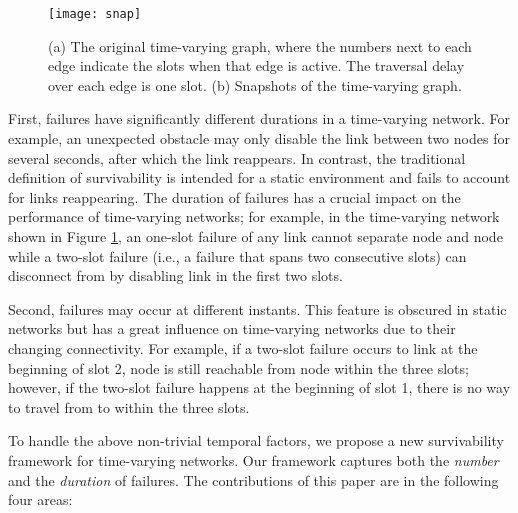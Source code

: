 \documentclass[10pt, conference, letterpaper]{IEEEtran}
\begin{document}
\begin{figure}[tbp]
\begin{center}
\texttt{[image: snap]}
\caption{(a) The original time-varying graph, where the numbers next to each edge indicate the slots when that edge is active. The traversal delay over each edge is one slot. (b) Snapshots of the time-varying graph.}
\label{snap}
\end{center}\vspace{-3mm}
\end{figure}

First, failures have significantly different durations in a time-varying network. For example, an unexpected obstacle may only disable the link between two nodes for several seconds, after which the link reappears. In contrast, the traditional definition of survivability is intended for a static environment and fails to account for links reappearing. The duration of failures has a crucial impact on the performance of time-varying networks; for example, in the time-varying network shown in Figure \ref{snap}, an one-slot failure of any link cannot separate node  and node  while a two-slot failure (i.e., a failure that spans two consecutive slots) can disconnect  from  by disabling link  in the first two slots.

Second, failures may occur at different instants. This feature is obscured in static networks but has a great influence on time-varying networks due to their changing connectivity. For example, if a two-slot failure occurs to link  at the beginning of slot 2, node  is still reachable from node  within the three slots; however, if the two-slot failure happens  at the beginning of slot 1, there is no way to travel from  to  within the three slots.

To handle the above non-trivial temporal factors, we propose a new survivability framework for time-varying networks. Our framework captures both the \emph{number} and the \emph{duration} of failures. The contributions of this paper are in the following four areas:



\end{document}
